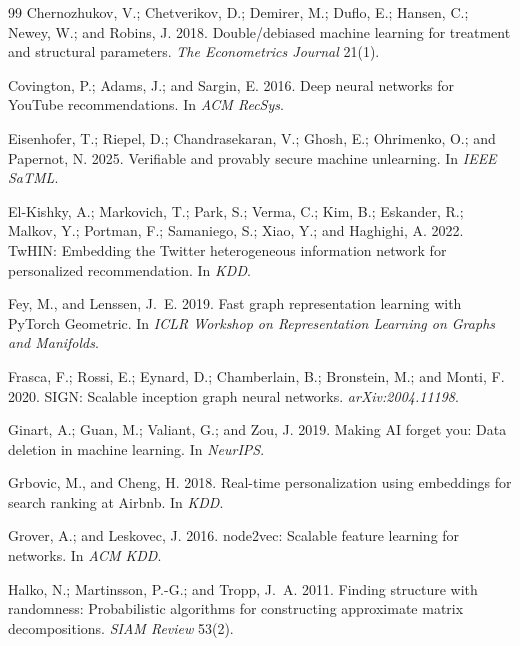 \documentclass[10pt,twocolumn,letterpaper]{article}
\theoremstyle{definition}
\begin{document}
\begin{thebibliography}{99}
Chernozhukov, V.; Chetverikov, D.; Demirer, M.; Duflo, E.; Hansen, C.; Newey, W.; and Robins, J. 2018.
\newblock Double/debiased machine learning for treatment and structural parameters.
\newblock \emph{The Econometrics Journal} 21(1).

Covington, P.; Adams, J.; and Sargin, E. 2016.
\newblock Deep neural networks for {YouTube} recommendations.
\newblock In \emph{ACM RecSys}.

Eisenhofer, T.; Riepel, D.; Chandrasekaran, V.; Ghosh, E.; Ohrimenko, O.; and Papernot, N. 2025.
\newblock Verifiable and provably secure machine unlearning.
\newblock In \emph{IEEE SaTML}.

El-Kishky, A.; Markovich, T.; Park, S.; Verma, C.; Kim, B.; Eskander, R.; Malkov, Y.; Portman, F.; Samaniego, S.; Xiao, Y.; and Haghighi, A. 2022.
\newblock TwHIN: Embedding the Twitter heterogeneous information network for personalized recommendation.
\newblock In \emph{KDD}.

Fey, M., and Lenssen, J.~E. 2019.
\newblock Fast graph representation learning with PyTorch Geometric.
\newblock In \emph{ICLR Workshop on Representation Learning on Graphs and Manifolds}.

Frasca, F.; Rossi, E.; Eynard, D.; Chamberlain, B.; Bronstein, M.; and Monti, F. 2020.
\newblock SIGN: Scalable inception graph neural networks.
\newblock \emph{arXiv:2004.11198}.

Ginart, A.; Guan, M.; Valiant, G.; and Zou, J. 2019.
\newblock Making AI forget you: Data deletion in machine learning.
\newblock In \emph{NeurIPS}.

Grbovic, M., and Cheng, H. 2018.
\newblock Real-time personalization using embeddings for search ranking at Airbnb.
\newblock In \emph{KDD}.

Grover, A.; and Leskovec, J. 2016.
\newblock node2vec: Scalable feature learning for networks.
\newblock In \emph{ACM KDD}.

Halko, N.; Martinsson, P.-G.; and Tropp, J.~A. 2011.
\newblock Finding structure with randomness: Probabilistic algorithms for constructing approximate matrix decompositions.
\newblock \emph{SIAM Review} 53(2).


\end{thebibliography}
\end{document}
